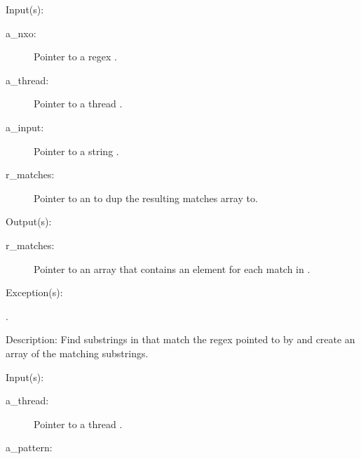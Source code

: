 \begin{capi}
\label{nxo_regex_match}
	\begin{capilist}
	\item[Input(s): ]
		\begin{description}\item[]
		\item[a\_nxo: ]
			Pointer to a regex .
		\item[a\_thread: ]
			Pointer to a thread .
		\item[a\_input: ]
			Pointer to a string .
		\item[r\_matches: ]
			Pointer to an  to dup the resulting
			matches array to.
		\end{description}
	\item[Output(s): ]
		\begin{description}\item[]
		\item[r\_matches: ]
			Pointer to an array  that contains an
			element for each match in .
		\end{description}
	\item[Exception(s): ]
		\begin{description}\item[]
		\item[.]
		\end{description}
	\item[Description: ]
		Find substrings in  that match the regex pointed
		to by  and create an array of the matching
		substrings.
	\end{capilist}
\label{nxo_regex_new}
	\begin{capilist}
	\item[Input(s): ]
		\begin{description}\item[]
		\item[a\_thread: ]
			Pointer to a thread \classname{nxo}.
		\item[a\_pattern: ]

\end{description}
\end{capilist}
\end{capi}
